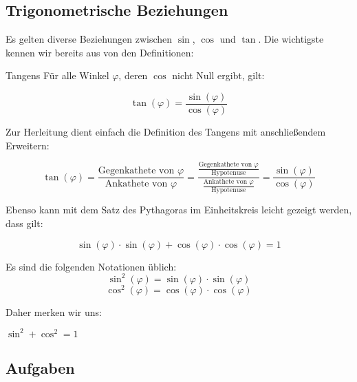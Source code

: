 \subsection{Trigonometrische Beziehungen}
Es gelten diverse Beziehungen zwischen $\sin$, $\cos$ und $\tan$. Die
wichtigste kennen wir bereits aus von den Definitionen:

\begin{gesetz}{Tangens}{}
  Für alle Winkel $\varphi$, deren $\cos$ nicht Null ergibt, gilt:

  $$\tan(\varphi) = \frac{\sin(\varphi)}{\cos(\varphi)}$$
  \end{gesetz}
Zur Herleitung dient einfach die Definition des Tangens mit
anschließendem Erweitern:

$$\tan(\varphi) = \frac{\textrm{Gegenkathete von
  }\varphi}{\textrm{Ankathete von }\varphi} =
\frac{\frac{\textrm{Gegenkathete von }
    \varphi}{\textrm{Hypotenuse}}}{\frac{\textrm{Ankathete von }\varphi}{\textrm{Hypotenuse}}}
=\frac{\sin(\varphi)}{\cos(\varphi)}$$

Ebenso kann mit dem Satz des Pythagoras im Einheitskreis leicht
gezeigt werden, dass gilt:

\begin{gesetz}{}{}
  $$\sin(\varphi)\cdot \sin(\varphi) + \cos(\varphi) \cdot
  \cos(\varphi) = 1$$
\end{gesetz}

\begin{bemerkung}{}{}
  Es sind die folgenden Notationen üblich:
  $$\sin^2(\varphi) = \sin(\varphi)\cdot\sin(\varphi)$$
  $$\cos^2(\varphi) = \cos(\varphi)\cdot\cos(\varphi)$$
\end{bemerkung}
Daher merken wir uns:
\begin{bemerkung}{}{}
  $\sin^2+\cos^2 = 1$
  \end{bemerkung}
\subsection*{Aufgaben}
